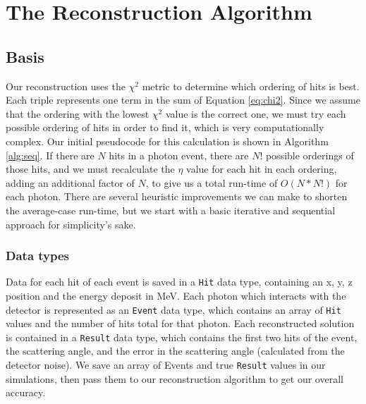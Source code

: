 \chapter{The Reconstruction Algorithm}

\section{Basis}

Our reconstruction uses the $\chi^2$ metric to determine which ordering of hits is best. Each triple represents one term in the sum of Equation \ref{eq:chi2}. Since we assume that the ordering with the lowest $\chi^2$ value is the correct one, we must try each possible ordering of hits in order to find it, which is very computationally complex. Our initial pseudocode for this calculation is shown in Algorithm \ref{alg:seq}. If there are $N$ hits in a photon event, there are $N!$ possible orderings of those hits, and we must recalculate the $\eta$ value for each hit in each ordering, adding an additional factor of $N$, to give us a total run-time of $O(N*N!)$ for each photon. There are several heuristic improvements we can make to shorten the average-case run-time, but we start with a basic iterative and sequential approach for simplicity's sake.

\subsection{Data types}
Data for each hit of each event is saved in a \texttt{Hit} data type, containing an x, y, z position and the energy deposit in MeV. Each photon which interacts with the detector is represented as an \texttt{Event} data type, which contains an array of \texttt{Hit} values and the number of hits total for that photon. Each reconstructed solution is contained in a \texttt{Result} data type, which contains the first two hits of the event, the scattering angle, and the error in the scattering angle (calculated from the detector noise). We save an array of Events and true \texttt{Result} values in our simulations, then pass them to our reconstruction algorithm to get our overall accuracy.

